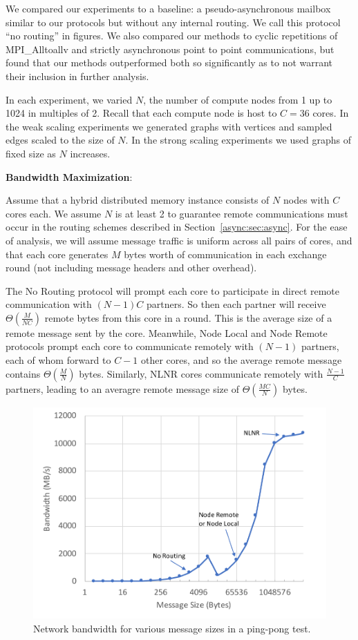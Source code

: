 \documentclass[10]{report}
\begin{document}
We compared our experiments to a baseline: a pseudo-asynchronous mailbox similar to our protocols but without any internal routing. 
We call this protocol ``no routing'' in figures. 
We also compared our methods to cyclic repetitions of MPI\_Alltoallv and strictly asynchronous point to point communications, but found that our methods outperformed both so significantly as to not warrant their inclusion in further analysis. 

In each experiment, we varied $N$, the number of compute nodes from 1 up to 1024 in multiples of 2. 
Recall that each compute node is host to $C=36$ cores. 
In the weak scaling experiments we generated graphs with vertices and sampled edges scaled to the size of $N$. 
In the strong scaling experiments we used graphs of fixed size as $N$ increases.


\noindent
\textbf{Bandwidth Maximization}:

Assume that a hybrid distributed memory instance consists of $N$ nodes with $C$ cores each.
We assume $N$ is at least 2 to guarantee remote communications must occur in the routing schemes described in Section~\ref{async:sec:async}. 
For the ease of analysis, we will assume message traffic is uniform across all pairs of cores, and that each core generates $M$ bytes worth of communication in each exchange round (not including message headers and other overhead).

The No Routing protocol will prompt each core to participate in direct remote communication with $(N-1)C$ partners.
So then each partner will receive $\Theta \left ( \frac{M}{NC} \right )$ remote bytes from this core in a round.
This is the average size of a remote message sent by the core.
Meanwhile, Node Local and Node Remote protocols prompt each core to communicate remotely with $(N-1)$ partners, each of whom forward to $C-1$ other cores, and so the average remote message contains $\Theta \left ( \frac{M}{N} \right )$ bytes. 
Similarly, NLNR cores communicate remotely with $\frac{N-1}{C}$ partners, leading to an averagre remote message size of $\Theta \left ( \frac{MC}{N} \right )$ bytes.

\begin{figure}
	\centerline{\includegraphics[width=0.8\columnwidth]{ping_pong}}
	\caption{Network bandwidth for various message sizes in a ping-pong test.
			\label{fig:ping_pong}}
\end{figure}
\end{document}
